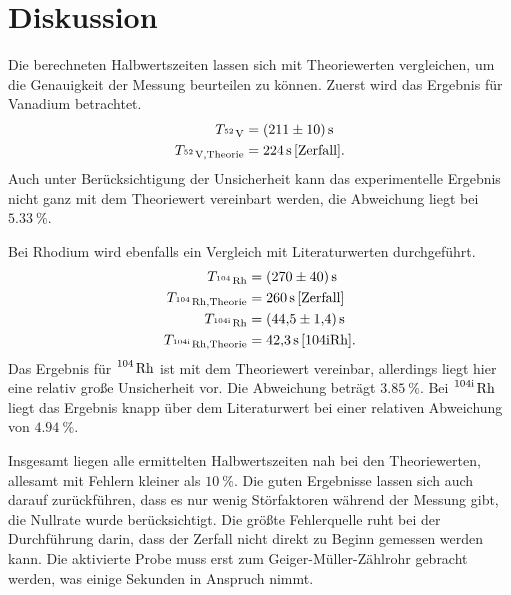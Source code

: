 \section{Diskussion}
\label{sec:Diskussion}

Die berechneten Halbwertszeiten lassen sich mit Theoriewerten vergleichen, um die Genauigkeit der
Messung beurteilen zu können.
Zuerst wird das Ergebnis für Vanadium betrachtet.
\begin{align*}
    T_{\ce{^52 V}} &= \qty{211+-10}{\second} \\
    T_{\ce{^52 V}, \text{Theorie}} &= \qty{224}{\second}\,\text{\cite{Zerfall}}.
\end{align*}
Auch unter Berücksichtigung der Unsicherheit kann das experimentelle Ergebnis nicht ganz mit
dem Theoriewert vereinbart werden, die Abweichung liegt bei $\qty{5.33}{\percent}$.

Bei Rhodium wird ebenfalls ein Vergleich mit Literaturwerten durchgeführt.
\begin{align*}
    T_{\ce{^104 Rh}} &= \qty{270+-40}{\second} \\
    T_{\ce{^104 Rh}, \text{Theorie}} &= \qty{260}{\second}\,\text{\cite{Zerfall}} \\
    T_{\ce{^{104\text{i}} Rh}} &= \qty{44.5+-1.4}{\second} \\
    T_{\ce{^{104\text{i}} Rh}, \text{Theorie}} &= \qty{42.3}{\second}\,\text{\cite{104iRh}}.
\end{align*}
Das Ergebnis für $\ce{^104 Rh}$ ist mit dem Theoriewert vereinbar, allerdings liegt hier eine
relativ große Unsicherheit vor. Die Abweichung beträgt $\qty{3.85}{\percent}$.
Bei $\ce{^{104\text{i}} Rh}$ liegt das Ergebnis knapp über dem Literaturwert bei einer relativen
Abweichung von $\qty{4.94}{\percent}$.

Insgesamt liegen alle ermittelten Halbwertszeiten nah bei den Theoriewerten, allesamt mit Fehlern kleiner
als $\qty{10}{\percent}$. Die guten Ergebnisse lassen sich auch darauf zurückführen, dass es nur wenig
Störfaktoren während der Messung gibt, die Nullrate wurde berücksichtigt.
Die größte Fehlerquelle ruht bei der Durchführung darin, dass der Zerfall nicht direkt zu Beginn gemessen
werden kann. Die aktivierte Probe muss erst zum Geiger-Müller-Zählrohr gebracht werden, was einige Sekunden
in Anspruch nimmt.